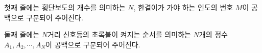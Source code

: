 첫째 줄에는 횡단보도의 개수를 의미하는 $N$, 한결이가 가야 하는 인도의 번호 $M$이 공백으로 구분되어 주어진다.

둘째 줄에는 $N$거리 신호등의 초록불이 켜지는 순서를 의미하는 $N$개의 정수 $A_1, A_2, \cdots, A_N$이 공백으로 구분되어 주어진다.